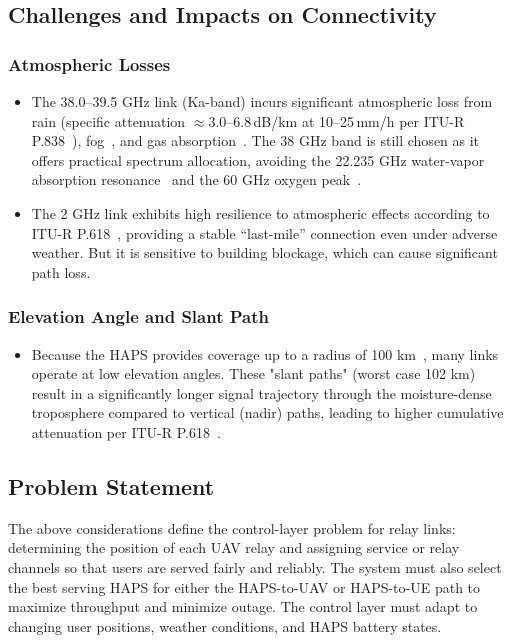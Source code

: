 \documentclass[conference]{IEEEtran}
\begin{document}
\subsection{Challenges and Impacts on Connectivity}
\subsubsection{Atmospheric Losses}
\begin{itemize}
  \item The 38.0--39.5 GHz link (Ka-band) incurs significant atmospheric loss from rain (specific attenuation $\approx$3.0--6.8\,dB/km at 10--25\,mm/h per ITU-R P.838~\cite{itu_p838}), fog~\cite{itu_p840}, and gas absorption~\cite{itu_p676}. The 38 GHz band is still chosen as it offers practical spectrum allocation, avoiding the 22.235 GHz water-vapor absorption resonance~\cite{itu_p676} and the 60 GHz oxygen peak~\cite{itu_p676}.
  \item The 2 GHz link exhibits high resilience to atmospheric effects according to ITU-R P.618~\cite{itu_p618}, providing a stable ``last-mile'' connection even under adverse weather. But it is sensitive to building blockage, which can cause significant path loss.
\end{itemize}
\subsubsection{Elevation Angle and Slant Path}
\begin{itemize}
\item[] Because the HAPS provides coverage up to a radius of 100 km~\cite{itu_m2106}, many links operate at low elevation angles. These "slant paths" (worst case 102 km) result in a significantly longer signal trajectory through the moisture-dense troposphere compared to vertical (nadir) paths, leading to higher cumulative attenuation per ITU-R P.618~\cite{itu_p618}.
\end{itemize}

\subsection{Problem Statement}
The above considerations define the control-layer problem for relay links: determining the position of each UAV relay and assigning service or relay channels so that users are served fairly and reliably. The system must also select the best serving HAPS for either the HAPS-to-UAV or HAPS-to-UE path to maximize throughput and minimize outage. The control layer must adapt to changing user positions, weather conditions, and HAPS battery states. 
\end{document}
